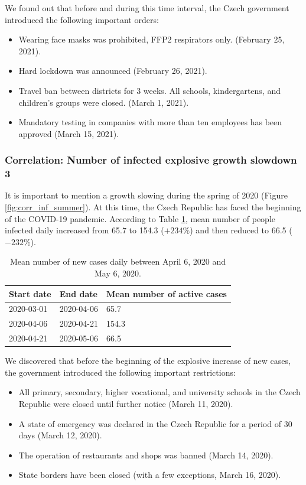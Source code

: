 We found out that before and during this time interval, the Czech government introduced the following important orders:
\begin{itemize}
    \item Wearing face masks was prohibited, FFP2 respirators only. (February 25, 2021).
    \item Hard lockdown was announced (February 26, 2021).
    \item Travel ban between districts for 3 weeks. All schools, kindergartens, and children's groups were closed. (March 1, 2021).
    \item Mandatory testing in companies with more than ten employees has been approved (March 15, 2021).
\end{itemize}

\subsubsection{Correlation: Number of infected explosive growth slowdown 3}

It is important to mention a growth slowing during the spring of 2020 (Figure \ref{fig:corr_inf_summer}). At this time, the Czech Republic has faced the beginning of the COVID-19 pandemic. According to Table \ref{tab:new_cases_mean_3}, mean number of people infected daily increased from 65.7 to 154.3 ($+234\%$) and then reduced to 66.5 ($-232\%$). 

\begin{table}[!htb]
\centering
\begin{tabular}{|l|l|l|}
\hline
Start date & End date & Mean number of active cases \\ \hline
2020-03-01 & 2020-04-06 & 65.7\\ \hline
2020-04-06 & 2020-04-21 & 154.3\\ \hline
2020-04-21 & 2020-05-06 & 66.5\\ \hline
\end{tabular}
\caption{Mean number of new cases daily between April 6, 2020 and May 6, 2020.}
\label{tab:new_cases_mean_3}
\end{table}

We discovered that before the beginning of the explosive increase of new cases, the government introduced the following important restrictions:
\begin{itemize}
    \item All primary, secondary, higher vocational, and university schools in the Czech Republic were closed until further notice (March 11, 2020).
    \item A state of emergency was declared in the Czech Republic for a period of 30 days (March 12, 2020).
    \item The operation of restaurants and shops was banned (March 14, 2020).
    \item State borders have been closed (with a few exceptions, March 16, 2020). 
\end{itemize}

